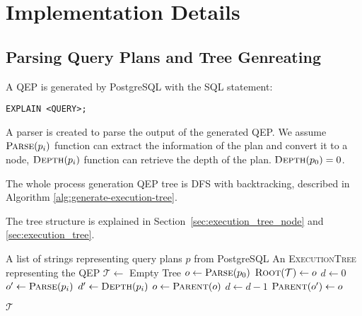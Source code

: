 \section{Implementation Details}
\label{sec:algo}

\subsection{Parsing Query Plans and Tree Genreating}

A QEP is generated by PostgreSQL with the SQL statement:
\begin{lstlisting}
EXPLAIN <QUERY>;
\end{lstlisting}
A parser is created to parse the output of the generated QEP. We assume $\textsc{Parse}(p_i)$ function can extract the information of the plan and convert it to a node, $\textsc{Depth}(p_i)$ function can retrieve the depth of the plan. $\textsc{Depth}(p_0) = 0$.

The whole process generation QEP tree is DFS with backtracking, described in Algorithm \ref{alg:generate-execution-tree}.

The tree structure is explained in Section~\ref{sec:execution_tree_node} and \ref{sec:execution_tree}.

\begin{algorithm}[ht]
\caption{$\textsc{GenerateExecutionTree}(p)$}
\label{alg:generate-execution-tree}
\begin{algorithmic}[1]
\Require A list of strings representing query plans $p$ from PostgreSQL
\Ensure An \textsc{ExecutionTree} representing the QEP
\State $\mathcal{T}\leftarrow$ Empty Tree
\State $o\leftarrow \textsc{Parse}(p_0)$
\State $\textsc{Root}(\mathcal{T})\leftarrow o$
\State $d\leftarrow 0$
    \State $o'\leftarrow \textsc{Parse}(p_i)$
    \State $d'\leftarrow \textsc{Depth}(p_i)$
    \State $o\leftarrow\textsc{Parent}(o)$
    \State $d\leftarrow d - 1$
    \EndWhile
    \State $\textsc{Parent}(o')\leftarrow o$
\EndFor

\State \Return $\mathcal{T}$
\end{algorithmic}
\end{algorithm}



